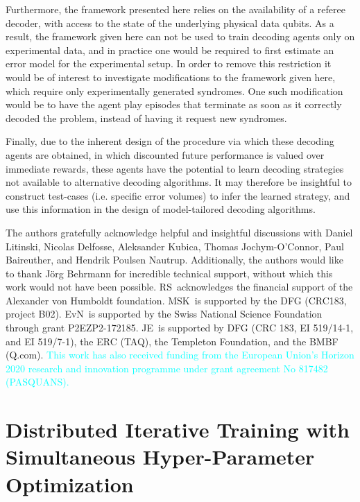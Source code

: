\documentclass[twocolumn,preprintnumbers,amsmath,amssymb,notitlepage,nofootinbib,longbibliography,superscriptaddress,aps,pra,10pt]{revtex4-1}
\newcommand{\je}[1]{\textcolor{cyan}{#1}}
\begin{document}
	Furthermore, the framework presented here relies on the availability of a referee decoder, with access to the state of the underlying physical data qubits.
	As a result, the framework given here can not be used to train decoding agents only on experimental data, and in practice one would be required to first estimate an error model for the experimental setup.
	In order to remove this restriction it would be of interest to investigate modifications to the framework given here, which require only experimentally generated syndromes.
	One such modification would be to have the agent play episodes that terminate as soon as it correctly decoded the problem, instead of having it request new syndromes.

	Finally, due to the inherent design of the procedure via which these decoding agents are obtained, in which discounted future performance is valued over immediate rewards, these agents have
	the potential to learn decoding strategies not available to alternative decoding algorithms.
	It may therefore be insightful to construct test-cases (i.e. specific error volumes) to infer the learned strategy, and use this information in the design of model-tailored decoding algorithms.


	\begin{acknowledgments}
		The authors gratefully acknowledge helpful and insightful discussions with Daniel Litinski, Nicolas Delfosse, Aleksander Kubica, Thomas Jochym-O'Connor, Paul Baireuther, and Hendrik Poulsen Nautrup.
		Additionally, the authors would like to thank J\"{o}rg Behrmann for incredible technical support, without which this work would not have been possible.
		RS\ acknowledges the financial support of the Alexander von Humboldt foundation.
		MSK\ is supported by the DFG (CRC183, project B02).
		EvN\ is supported by the Swiss National Science Foundation through grant P2EZP2-172185.
		JE\ is supported by DFG (CRC 183, EI 519/14-1, and EI 519/7-1), the ERC (TAQ), the Templeton Foundation, and the BMBF (Q.com).
		\je{This work has also received funding from the European Union's Horizon 2020
		research and innovation programme under grant agreement No 817482 (PASQUANS).}
	\end{acknowledgments}

\appendix

\section{Distributed Iterative Training with Simultaneous Hyper-Parameter Optimization}\label{A:training}
\end{document}
